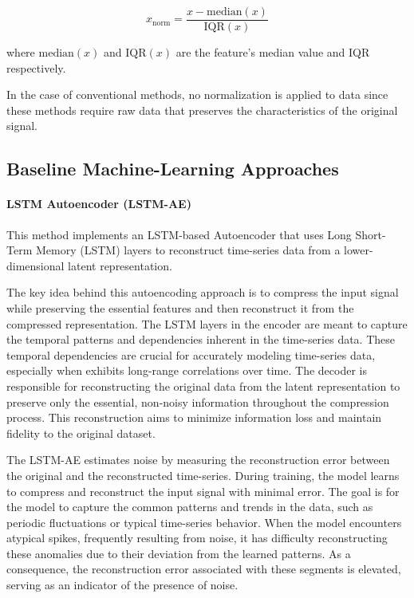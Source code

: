 \documentclass[conference]{IEEEtran}
\begin{document}
\begin{equation}
    x_{\text{norm}} = \frac{x - \mathrm{median}(x)}{\mathrm{IQR}(x)} \label{eq:robust_norm}
\end{equation}

where $\mathrm{median}(x)$ and $\mathrm{IQR}(x)$ are the feature's median value and IQR respectively.

In the case of conventional methods, no normalization is applied to data since these methods require raw data that preserves the characteristics of the original signal.


\subsection{Baseline Machine-Learning Approaches}

\paragraph{LSTM Autoencoder (LSTM-AE)}
This method implements an LSTM-based Autoencoder that uses Long Short-Term Memory (LSTM) layers to reconstruct time-series data from a lower-dimensional latent representation. 

The key idea behind this autoencoding approach is to compress the input signal while preserving the essential features and then reconstruct it from the compressed representation. The LSTM layers in the encoder are meant to capture the temporal patterns and dependencies inherent in the time-series data. These temporal dependencies are crucial for accurately modeling time-series data, especially when exhibits long-range correlations over time. The decoder is responsible for reconstructing the original data from the latent representation to preserve only the essential, non-noisy information throughout the compression process. This reconstruction aims to minimize information loss and maintain fidelity to the original dataset. 

The LSTM-AE estimates noise by measuring the reconstruction error between the original and the reconstructed time-series. During training, the model learns to compress and reconstruct the input signal with minimal error. The goal is for the model to capture the common patterns and trends in the data, such as periodic fluctuations or typical time-series behavior. When the model encounters atypical spikes, frequently resulting from noise, it has difficulty reconstructing these anomalies due to their deviation from the learned patterns. As a consequence, the reconstruction error associated with these segments is elevated, serving as an indicator of the presence of noise.
\end{document}
